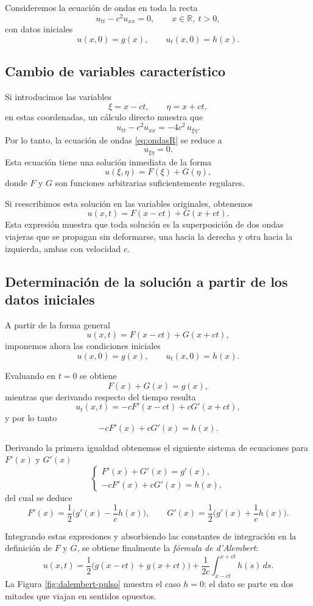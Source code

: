 \documentclass[12pt, a4paper]{amsbook}
\newcommand{\R}{{\mathbb R}}
\theoremstyle{remark}
\theoremstyle{definition}
\numberwithin{section}{chapter}
\numberwithin{subsection}{section}
\numberwithin{equation}{section}
\numberwithin{figure}{chapter}
\begin{document}
Consideremos la ecuación de ondas en toda la recta
\begin{equation}\label{eq:ondasR}
u_{tt} - c^2 u_{xx} = 0,
\qquad x\in\R,\ t>0,
\end{equation}
con datos iniciales
\[
u(x,0)=g(x), \qquad u_t(x,0)=h(x).
\]

\subsection*{Cambio de variables característico}

Si introducimos las variables
\[
\xi = x - ct,
\qquad
\eta = x + ct,
\]
en estas coordenadas, un cálculo directo muestra que
\[
u_{tt} - c^2 u_{xx}
=
-4c^2\, u_{\xi\eta}.
\]
Por lo tanto, la ecuación de ondas \eqref{eq:ondasR} se reduce a
\[
u_{\xi\eta}=0.
\]
Esta ecuación tiene una solución inmediata de la forma
$$
u(\xi, \eta) = F(\xi) + G(\eta),
$$
donde $F$ y $G$ son funciones arbitrarias suficientemente regulares.

Si reescribimos esta solución en las variables originales, obtenemos
\[
u(x,t) = F(x-ct) + G(x+ct).
\]
Esta expresión muestra que toda solución es la superposición de dos ondas viajeras que se propagan sin deformarse, una hacia la derecha y otra hacia la izquierda, ambas con velocidad $c$.


\subsection*{Determinación de la solución a partir de los datos iniciales}

A partir de la forma general
\[
u(x,t)=F(x-ct)+G(x+ct),
\]
imponemos ahora las condiciones iniciales
\[
u(x,0)=g(x), \qquad u_t(x,0)=h(x).
\]

Evaluando en $t=0$ se obtiene
\[
F(x)+G(x)=g(x),
\]
mientras que derivando respecto del tiempo resulta
\[
u_t(x,t)=-cF'(x-ct)+cG'(x+ct),
\]
y por lo tanto
\[
-cF'(x)+cG'(x)=h(x).
\]

Derivando la primera igualdad obtenemos el siguiente sistema de ecuaciones para $F'(x)$ y $G'(x)$
\[
\begin{cases}
F'(x)+G'(x)=g'(x),\\[4pt]
-cF'(x)+cG'(x)=h(x),
\end{cases}
\]
del cual se deduce
\[
F'(x)=\frac12\Big(g'(x)-\frac{1}{c}h(x)\Big),
\qquad
G'(x)=\frac12\Big(g'(x)+\frac{1}{c}h(x)\Big).
\]

Integrando estas expresiones y absorbiendo las constantes de integración en la
definición de $F$ y $G$, se obtiene finalmente la \emph{fórmula de d'Alembert}:
\begin{equation}\label{eq:dalembert}
u(x,t)
=
\frac12\big(g(x-ct)+g(x+ct)\big)
+
\frac{1}{2c}
\int_{x-ct}^{x+ct} h(s)\,ds.
\end{equation}
La Figura \ref{fig:dalembert-pulso} muestra el caso $h=0$: el dato se parte en dos mitades que viajan en sentidos opuestos.
\end{document}

